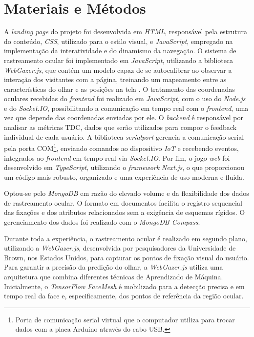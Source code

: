 \documentclass[11pt,a4paper]{article}
\begin{document}
\section{Materiais e Métodos}

A \textit{landing page} do projeto foi desenvolvida em \textit{HTML}, responsável pela estrutura do conteúdo, \textit{CSS}, utilizado para o estilo visual, e \textit{JavaScript}, empregado na implementação da interatividade e do dinamismo da navegação. O sistema de rastreamento ocular foi implementado em \textit{JavaScript}, utilizando a biblioteca \textit{WebGazer.js}, que contém um modelo capaz de se autocalibrar ao observar a interação dos visitantes com a página, treinando um mapeamento entre as características do olhar e as posições na tela \cite{papoutsaki2016webgazer}. O tratamento das coordenadas oculares recebidas do \textit{frontend} foi realizado em \textit{JavaScript}, com o uso do \textit{Node.js} e do \textit{Socket.IO}, possibilitando a comunicação em tempo real com o \textit{frontend}, uma vez que depende das coordenadas enviadas por ele. O \textit{backend} é responsável por analisar as métricas TDC, dados que serão utilizados para compor o feedback individual de cada usuário. A biblioteca \textit{serialport} gerencia a comunicação serial pela porta COM\footnote{Porta de comunicação serial virtual que o computador utiliza para trocar dados com a placa Arduino através do cabo USB.}, enviando comandos ao dispositivo \textit{IoT} e recebendo eventos, integrados ao \textit{frontend} em tempo real via \textit{Socket.IO}. Por fim, o jogo \textit{web} foi desenvolvido em \textit{TypeScript}, utilizando o \textit{framework} \textit{Next.js}, o que proporcionou um código mais robusto, organizado e uma experiência de uso moderna e fluida.

Optou-se pelo \textit{MongoDB} em razão do elevado volume e da flexibilidade dos dados de rastreamento ocular. O formato em documentos facilita o registro sequencial das fixações e dos atributos relacionados sem a exigência de esquemas rígidos. O gerenciamento dos dados foi realizado com o \textit{MongoDB Compass}.

Durante toda a experiência, o rastreamento ocular é realizado em segundo plano, utilizando a \textit{WebGazer.js}, desenvolvida por pesquisadores da Universidade de Brown, nos Estados Unidos, para capturar os pontos de fixação visual do usuário. Para garantir a precisão da predição do olhar, a \textit{WebGazer.js} utiliza uma arquitetura que combina diferentes técnicas de Aprendizado de Máquina. Inicialmente, o \textit{TensorFlow FaceMesh} é mobilizado para a detecção precisa e em tempo real da face e, especificamente, dos pontos de referência da região ocular. 
\end{document}
